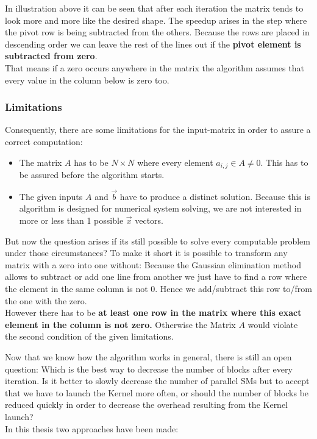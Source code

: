 \documentclass[draft, final]{vutinfth} %
\begin{document}
				In illustration above it can be seen that after each iteration the matrix tends to look more and more like the desired shape. The speedup arises in the step where the pivot row is being subtracted from the others. Because the rows are placed in descending order we can leave the rest of the lines out if the \textbf{pivot element is subtracted from zero}.\\ That means if a zero occurs anywhere in the matrix the algorithm assumes that every value in the column below is zero too.

			\subsubsection{Limitations}
			\label{sssec:limitations}
				Consequently, there are some limitations for the input-matrix in order to assure a correct computation:
				\begin{itemize}
					\item The matrix $A$ has to be $N \times N$ where every element $a_{i,j} \in A \neq 0$. This has to be assured before the algorithm starts.

					\item The given inputs $A$ and $\vec{b}$ have to produce a distinct solution. Because this is algorithm is designed for numerical system solving, we are not interested in more or less than 1 possible $\vec{x}$ vectors.
				\end{itemize}
				
				But now the question arises if its still possible to solve every computable problem under those circumstances? To make it short it is possible to transform any matrix with a zero into one without: Because the Gaussian elimination method allows to subtract or add one line from another we just have to find a row where the element in the same column is not 0. Hence we add/subtract this row to/from the one with the zero.\\
				However there has to be \textbf{at least one row in the matrix where this exact element in the column is not zero.} Otherwise the Matrix $A$ would violate the second condition of the given limitations.

			Now that we know how the algorithm works in general, there is still an open question: Which is the best way to decrease the number of blocks after every iteration. Is it better to slowly decrease the number of parallel SMs but to accept that we have to launch the Kernel more often, or should the number of blocks be reduced quickly in order to decrease the overhead resulting from the Kernel launch?\\
			In this thesis two approaches have been made:
\end{document}
